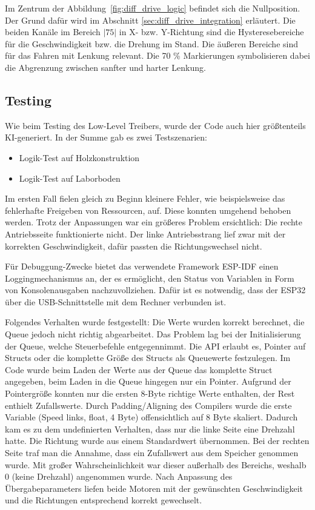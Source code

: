 Im Zentrum der Abbildung~\ref{fig:diff_drive_logic} befindet sich die Nullposition. Der Grund dafür wird im Abschnitt \ref{sec:diff_drive_integration} erläutert. Die beiden Kanäle im Bereich $|75|$ in X- bzw. Y-Richtung sind die Hysteresebereiche für die Geschwindigkeit bzw. die Drehung im Stand. Die äußeren Bereiche sind für das Fahren mit Lenkung relevant. Die 70 \% Markierungen symbolisieren dabei die Abgrenzung zwischen sanfter und harter Lenkung.

\subsection{Testing} \label{sec:diff_drive_tests}

Wie beim Testing des Low-Level Treibers, wurde der Code auch hier größtenteils KI-generiert. In der Summe gab es zwei Testszenarien:

\begin{itemize}
    \item Logik-Test auf Holzkonstruktion
    \item Logik-Test auf Laborboden
\end{itemize}

Im ersten Fall fielen gleich zu Beginn kleinere Fehler, wie beispielsweise das fehlerhafte Freigeben von Ressourcen, auf. Diese konnten umgehend behoben werden. Trotz der Anpassungen war ein größeres Problem ersichtlich: Die rechte Antriebsseite funktionierte nicht. Der linke Antriebsstrang lief zwar mit der korrekten Geschwindigkeit, dafür passten die Richtungswechsel nicht. \newline

Für Debuggung-Zwecke bietet das verwendete Framework ESP-IDF einen Loggingmechanismus an, der es ermöglicht, den Status von Variablen in Form von Konsolenausgaben nachzuvollziehen. Dafür ist es notwendig, dass der ESP32 über die USB-Schnittstelle mit dem Rechner verbunden ist. \newline

Folgendes Verhalten wurde festgestellt: Die Werte wurden korrekt berechnet, die Queue jedoch nicht richtig abgearbeitet. Das Problem lag bei der Initialisierung der Queue, welche Steuerbefehle entgegennimmt. Die API erlaubt es, Pointer auf Structs oder die komplette Größe des Structs als Queuewerte festzulegen. Im Code wurde beim Laden der Werte aus der Queue das komplette Struct angegeben, beim Laden in die Queue hingegen nur ein Pointer. Aufgrund der Pointergröße konnten nur die ersten 8-Byte richtige Werte enthalten, der Rest enthielt Zufallswerte. Durch Padding/Aligning des Compilers wurde die erste Variable (Speed links, float, 4 Byte) offensichtlich auf 8 Byte skaliert. Dadurch kam es zu dem undefinierten Verhalten, dass nur die linke Seite eine Drehzahl hatte. Die Richtung wurde aus einem Standardwert übernommen. Bei der rechten Seite traf man die Annahme, dass ein Zufallswert aus dem Speicher genommen wurde. Mit großer Wahrscheinlichkeit war dieser außerhalb des Bereichs, weshalb 0 (keine Drehzahl) angenommen wurde. Nach Anpassung des Übergabeparameters liefen beide Motoren mit der gewünschten Geschwindigkeit und die Richtungen entsprechend korrekt gewechselt. \newline

